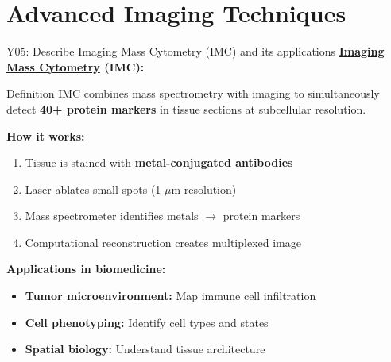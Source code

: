 \documentclass[aspectratio=169, 10pt]{beamer}
\begin{document}
\section{Advanced Imaging Techniques}

\begin{frame}{Y05: Describe Imaging Mass Cytometry (IMC) and its applications}
    \textbf{\href{https://en.wikipedia.org/wiki/Imaging_mass_cytometry}{Imaging Mass Cytometry} (IMC):}
    
    \begin{block}{Definition}
        IMC combines mass spectrometry with imaging to simultaneously detect \textbf{40+ protein markers} in tissue sections at subcellular resolution.
    \end{block}
    
    \vspace{0.2cm}
    \textbf{How it works:}
    \begin{enumerate}
        \item Tissue is stained with \textbf{metal-conjugated antibodies}
        \item Laser ablates small spots (1 $\mu$m resolution)
        \item Mass spectrometer identifies metals $\rightarrow$ protein markers
        \item Computational reconstruction creates multiplexed image
    \end{enumerate}
    
    \vspace{0.2cm}
    \textbf{Applications in biomedicine:}
    \begin{itemize}
        \item \textbf{Tumor microenvironment:} Map immune cell infiltration
        \item \textbf{Cell phenotyping:} Identify cell types and states
        \item \textbf{Spatial biology:} Understand tissue architecture
    \end{itemize}
\end{frame}
\end{document}
